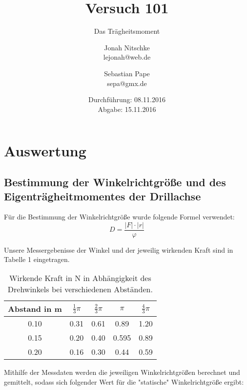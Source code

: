 

\title{Versuch 101}
\subtitle{Das Trägheitsmoment}
\author{Jonah Nitschke\\
        lejonah@web.de \and
        Sebastian Pape\\
        sepa@gmx.de}
\date{Durchführung: 08.11.2016\\
      Abgabe: 15.11.2016}





\maketitle



\section{Auswertung}
\subsection{Bestimmung der Winkelrichtgröße und des Eigenträgheitmomentes der Drillachse}
Für die Bestimmung der Winkelrichtgröße wurde folgende Formel verwendet:
\begin{equation}
  D = \frac{\lvert F \rvert \cdot \lvert r \rvert}{\varphi}
\end{equation}

Unsere Messergebenisse der Winkel und der jeweilig wirkenden Kraft sind in Tabelle 1 eingetragen.

\begin{table}
  \centering
  \caption{Wirkende Kraft in N in Abhängigkeit des Drehwinkels bei verschiedenen Abständen.}
  \label{tab:data1}
  \begin{tabular}{c c c c c}
    \toprule Abstand in m & $\frac{1}{3} \pi$ & $\frac{2}{3} \pi$ & $ \pi$ & $\frac{4}{3} \pi$ \\
    \midrule
    0.10 & 0.31 & 0.61 & 0.89  & 1.20 \\
    0.15 & 0.20 & 0.40 & 0.595 & 0.89 \\
    0.20 & 0.16 & 0.30 & 0.44  & 0.59 \\
    \bottomrule
  \end{tabular}
\end{table}

Mithilfe der Messdaten werden die jeweiligen Winkelrichtgrößen berechnet und gemittelt,
sodass sich folgender Wert für die "statische" Winkelrichtgröße ergibt:


